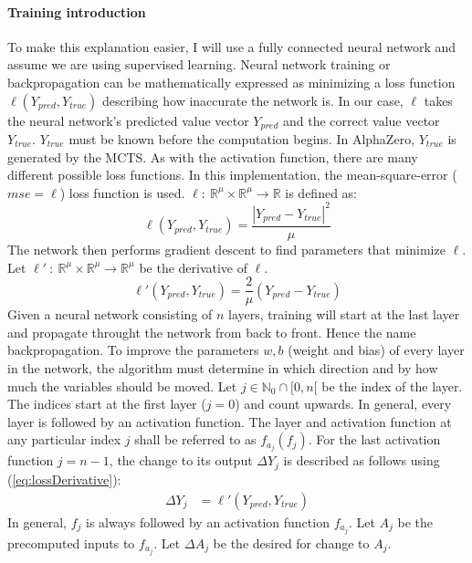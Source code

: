 \documentclass[12pt]{article}
\newcommand{\quckeq}[1]{(\ref{#1})}
\newcommand{\quickeq}[1]{\quckeq{#1}}
\begin{document}
\paragraph{Training introduction} 
To make this explanation easier, I will use a fully connected neural network and assume we are using supervised learning.
Neural network training or backpropagation can be mathematically expressed as minimizing a loss function  \(\ell(Y_{pred}, Y_{true})\) describing how inaccurate the network is. In our case, \(\ell\) takes the neural network's predicted value vector \(Y_{pred}\) and the correct value vector \(Y_{true}\). \(Y_{true}\) must be known before the computation begins. In AlphaZero, \(Y_{true}\) is generated by the MCTS. As with the activation function, there are many different possible loss functions. In this implementation, the mean-square-error (\(mse =\ell\)) loss function is used. \(\ell:~\mathbb R^\mu\times\mathbb R^\mu \to \mathbb R\) is defined as:
\begin{equation} \label{eq:NN:loss_mse}
\ell(Y_{pred}, Y_{true}) = \frac{|Y_{pred} - Y_{true}|^2}{\mu}
\end{equation}
The network then performs gradient descent to find parameters that minimize \(\ell\).  Let \(\ell'~:~\mathbb R^\mu \times \mathbb R^\mu \to \mathbb R^\mu\) be the derivative of \(\ell\).
\begin{equation}\label{eq:lossDerivative}
\ell'(Y_{pred}, Y_{true}) = \frac{2}{\mu} \left(Y_{pred} - Y_{true}\right)
\end{equation}
Given a neural network consisting of \(n\) layers, training will start at the last layer and propagate throught the network from back to front. Hence the name backpropagation. To improve the parameters \(w, b\) (weight and bias) of every layer in the network, the algorithm must determine in which direction and by how much the variables should be moved. Let \(j \in \mathbb N_0\cap [0,n[\) be the index of the layer. The indices start at the first layer (\(j=0\)) and count upwards. In general, every layer is followed by an activation function. The layer and activation function at any particular index \(j\) shall be referred to as \(f_{a_j}(f_j)\). For the last activation function \(j=n-1\), the change to its output \(\Delta Y_j\) is described as follows using  \quickeq{eq:lossDerivative}:
\begin{align}
\Delta Y_j &= \ell'(Y_{pred}, Y_{true})
\end{align}
In general, \(f_j\) is always followed by an activation function \(f_{a_j}\). Let \(A_j\) be the precomputed inputs to \(f_{a_j}\). Let \(\Delta A_j\) be the desired for change to \(A_j\).
\end{document}
